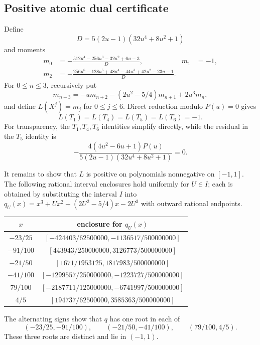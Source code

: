 \documentclass[11pt]{article}
\begin{document}
\subsection{Positive atomic dual certificate}

Define
\[
 D=5(2u-1)(32u^4+8u^2+1)
\]
and moments
\begin{align*}
 m_0&=-\frac{512u^4-256u^3-32u^2+6u-3}{D},
 &m_1&=-1,\\
 m_2&=-\frac{256u^6-128u^5+48u^4-44u^3+42u^2-23u-1}{D}.
\end{align*}
For $0\leq n\leq3$, recursively put
\begin{equation}\label{eq:recurrence}
 m_{n+3}=-um_{n+2}-(2u^2-5/4)m_{n+1}+2u^3m_n,
\end{equation}
and define $L(X^j)=m_j$ for $0\leq j\leq6$.
Direct reduction modulo $P(u)=0$ gives
\begin{equation}\label{eq:dual-moments}
 L(T_1)=L(T_4)=L(T_5)=L(T_6)=-1.
\end{equation}
For transparency, the $T_1,T_4,T_6$ identities simplify directly, while
the residual in the $T_5$ identity is
\[
 -\frac{4(4u^2-6u+1)P(u)}
 {5(2u-1)(32u^4+8u^2+1)}=0.
\]

It remains to show that $L$ is positive on polynomials nonnegative on
$[-1,1]$.  The following rational interval enclosures hold uniformly for
$U\in I$; each is obtained by substituting the interval $I$ into
$q_U(x)=x^3+Ux^2+(2U^2-5/4)x-2U^3$ with outward rational endpoints.
\begin{center}
\small
\begin{tabular}{c@{\qquad}c}
\toprule
$x$ & enclosure for $q_U(x)$ \\
\midrule
$-23/25$ & $[-424403/62500000,-1136517/500000000]$\\
$-91/100$ & $[443943/250000000,3126773/500000000]$\\
$-21/50$ & $[1671/1953125,1817983/500000000]$\\
$-41/100$ & $[-1299557/250000000,-1223727/500000000]$\\
$79/100$ & $[-2187711/125000000,-6741997/500000000]$\\
$4/5$ & $[194737/62500000,3585363/500000000]$\\
\bottomrule
\end{tabular}
\end{center}
The alternating signs show that $q$ has one root in each of
\begin{equation}\label{eq:root-intervals}
 (-23/25,-91/100),\qquad(-21/50,-41/100),\qquad(79/100,4/5).
\end{equation}
These three roots are distinct and lie in $(-1,1)$.
\end{document}
